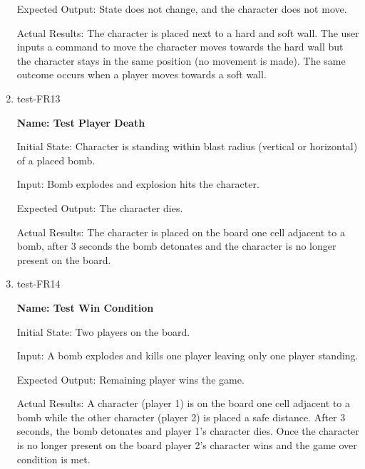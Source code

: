 \documentclass[12pt, titlepage]{article}
\begin{document}
\begin{enumerate}
Expected Output: State does not change, and the character does not move. 

Actual Results: The character is placed next to a hard and soft wall. The user inputs a command to move the character moves towards the hard wall but the character stays in the same position (no movement is made). The same outcome occurs when a player moves towards a soft wall.

\item{test-FR13\\}

\textbf{Name: Test Player Death}

Initial State: Character is standing within blast radius (vertical or horizontal) of a placed bomb.  
					
Input: Bomb explodes and explosion hits the character.
					
Expected Output: The character dies. 

Actual Results: The character is placed on the board one cell adjacent to a bomb, after 3 seconds the bomb detonates and the character is no longer present on the board.   

\item{test-FR14\\}

\textbf{Name: Test Win Condition}

Initial State: Two players on the board. 
					
Input: A bomb explodes and kills one player leaving only one player standing. 
					
Expected Output: Remaining player wins the game. 

Actual Results: A character (player 1) is on the board one cell adjacent to a bomb while the other character (player 2) is placed a safe distance. After 3 seconds, the bomb detonates and player 1's character dies. Once the character is no longer present on the board player 2's character wins and the game over condition is met.

\end{enumerate}
\end{document}
